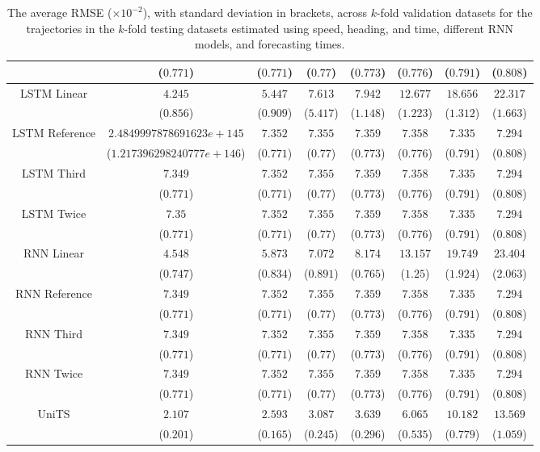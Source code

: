 \begin{table}[!ht]
{\begin{tabular}{|c|c|c|c|c|c|c|c|}
			 & ($0.771$) & ($0.771$) & ($0.77$) & ($0.773$) & ($0.776$) & ($0.791$) & ($0.808$) \\ \hline
			\multirow{2}{*}{LSTM Linear} & $4.245$ & $5.447$ & $7.613$ & $7.942$ & $12.677$ & $18.656$ & $22.317$ \\
			 & ($0.856$) & ($0.909$) & ($5.417$) & ($1.148$) & ($1.223$) & ($1.312$) & ($1.663$) \\ \hline
			\multirow{2}{*}{LSTM Reference} & $2.4849997878691623e+145$ & $7.352$ & $7.355$ & $7.359$ & $7.358$ & $7.335$ & $7.294$ \\
			 & ($1.217396298240777e+146$) & ($0.771$) & ($0.77$) & ($0.773$) & ($0.776$) & ($0.791$) & ($0.808$) \\ \hline
			\multirow{2}{*}{LSTM Third} & $7.349$ & $7.352$ & $7.355$ & $7.359$ & $7.358$ & $7.335$ & $7.294$ \\
			 & ($0.771$) & ($0.771$) & ($0.77$) & ($0.773$) & ($0.776$) & ($0.791$) & ($0.808$) \\ \hline
			\multirow{2}{*}{LSTM Twice} & $7.35$ & $7.352$ & $7.355$ & $7.359$ & $7.358$ & $7.335$ & $7.294$ \\
			 & ($0.771$) & ($0.771$) & ($0.77$) & ($0.773$) & ($0.776$) & ($0.791$) & ($0.808$) \\ \hline
			\multirow{2}{*}{RNN Linear} & $4.548$ & $5.873$ & $7.072$ & $8.174$ & $13.157$ & $19.749$ & $23.404$ \\
			 & ($0.747$) & ($0.834$) & ($0.891$) & ($0.765$) & ($1.25$) & ($1.924$) & ($2.063$) \\ \hline
			\multirow{2}{*}{RNN Reference} & $7.349$ & $7.352$ & $7.355$ & $7.359$ & $7.358$ & $7.335$ & $7.294$ \\
			 & ($0.771$) & ($0.771$) & ($0.77$) & ($0.773$) & ($0.776$) & ($0.791$) & ($0.808$) \\ \hline
			\multirow{2}{*}{RNN Third} & $7.349$ & $7.352$ & $7.355$ & $7.359$ & $7.358$ & $7.335$ & $7.294$ \\
			 & ($0.771$) & ($0.771$) & ($0.77$) & ($0.773$) & ($0.776$) & ($0.791$) & ($0.808$) \\ \hline
			\multirow{2}{*}{RNN Twice} & $7.349$ & $7.352$ & $7.355$ & $7.359$ & $7.358$ & $7.335$ & $7.294$ \\
			 & ($0.771$) & ($0.771$) & ($0.77$) & ($0.773$) & ($0.776$) & ($0.791$) & ($0.808$) \\ \hline
			\multirow{2}{*}{UniTS} & $2.107$ & $2.593$ & $3.087$ & $3.639$ & $6.065$ & $10.182$ & $13.569$ \\
			 & ($0.201$) & ($0.165$) & ($0.245$) & ($0.296$) & ($0.535$) & ($0.779$) & ($1.059$) \\ \hline
		\end{tabular}
	}
	\caption{The average RMSE ($\times 10^{-2}$), with standard deviation in brackets, across $k$-fold validation datasets for the trajectories in the $k$-fold testing datasets estimated using speed, heading, and time, different RNN models, and forecasting times.}
	\label{tab:all_speed_actual_dir_RMSE}
\end{table}